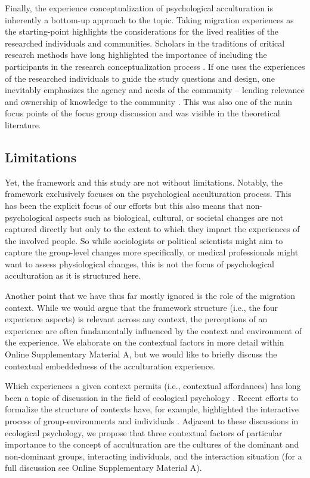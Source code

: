 \documentclass[man, 12pt, a4paper]{apa7}
\begin{document}
Finally, the experience conceptualization of psychological acculturation is inherently a bottom-up approach to the topic. Taking migration experiences as the starting-point highlights the considerations for the lived realities of the researched individuals and communities. Scholars in the traditions of critical research methods have long highlighted the importance of including the participants in the research conceptualization process \citep[e.g.,][]{Kovach2009}. If one uses the experiences of the researched individuals to guide the study questions and design, one inevitably emphasizes the agency and needs of the community -- lending relevance and ownership of knowledge to the community \citep[e.g., ][]{Schmidt2021}. This was also one of the main focus points of the focus group discussion and was visible in the theoretical literature.

\subsection{Limitations}
Yet, the framework and this study are not without limitations. Notably, the framework exclusively focuses on the psychological acculturation process. This has been the explicit focus of our efforts but this also means that non-psychological aspects such as biological, cultural, or societal changes are not captured directly but only to the extent to which they impact the experiences of the involved people. So while sociologists or political scientists might aim to capture the group-level changes more specifically, or medical professionals might want to assess physiological changes, this is not the focus of psychological acculturation as it is structured here. 

Another point that we have thus far mostly ignored is the role of the migration context. While we would argue that the framework structure (i.e., the four experience aspects) is relevant across any context, the perceptions of an experience are often fundamentally influenced by the context and environment of the experience. We elaborate on the contextual factors in more detail within Online Supplementary Material A, but we would like to briefly discuss the contextual embeddedness of the acculturation experience. 

Which experiences a given context permits (i.e., contextual affordances) has long been a topic of discussion in the field of ecological psychology \citep[e.g., see][]{Cantor1994}. Recent efforts to formalize the structure of contexts have, for example, highlighted the interactive process of group-environments and individuals \citep[e.g.,][]{Young2002}.
Adjacent to these discussions in ecological psychology, we propose that three contextual factors of particular importance to the concept of acculturation are the cultures of the dominant and non-dominant groups, interacting individuals, and the interaction situation (for a full discussion see Online Supplementary Material A).
\end{document}
